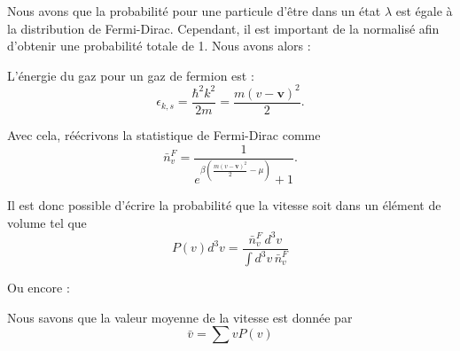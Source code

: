 

Nous avons que la probabilité pour une particule d'être dans un état $\lambda$ est égale à la distribution de Fermi-Dirac. Cependant, il est important de la normalisé afin 
d'obtenir une probabilité totale de 1. Nous avons alors :


L'énergie du gaz pour un gaz de fermion est :
\[
    \epsilon_{k,s} = \frac{\hbar^2k^2}{2m} = \frac{m(v - \mathbf{v})^2}{2}.
\]

Avec cela, réécrivons la statistique de Fermi-Dirac comme
\[
    \bar{n}_v^F = \frac{1}{e^{\beta(\frac{m(v - \mathbf{v})^2}{2} - \mu)} +1}.
\]

Il est donc possible d'écrire la probabilité que la vitesse soit dans un élément de volume tel que 
\[
    P(v)d^3v = \frac{\bar{n}_v^F \, d^3v}{\int d^3v \, \bar{n}_v^F}
\]

Ou encore :


Nous savons que la valeur moyenne de la vitesse est donnée par 
\[
    \bar{v} = \sum v P(v)
\]
\clearpage
